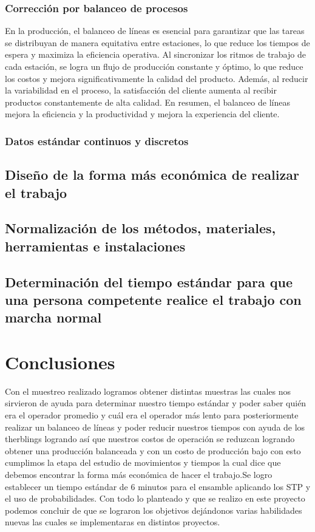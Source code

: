     \subsubsection{Corrección por balanceo de procesos}
    En la producción, el balanceo de líneas es esencial para garantizar que las tareas se distribuyan de manera equitativa entre estaciones, lo que reduce los tiempos de espera y maximiza la eficiencia operativa. Al sincronizar los ritmos de trabajo de cada estación, se logra un flujo de producción constante y óptimo, lo que reduce los costos y mejora significativamente la calidad del producto. Además, al reducir la variabilidad en el proceso, la satisfacción del cliente aumenta al recibir productos constantemente de alta calidad. En resumen, el balanceo de líneas mejora la eficiencia y la productividad y mejora la experiencia del cliente.
    \subsubsection{Datos estándar continuos y discretos}
    \subsection{Diseño de la forma más económica de realizar el trabajo}
    
    \subsection{Normalización de los métodos, materiales, herramientas e instalaciones}
    
    \subsection{Determinación del tiempo estándar para que una persona competente realice el trabajo con marcha normal}
    
    
    \section{Conclusiones}
    
    Con el muestreo realizado logramos obtener distintas muestras las cuales nos sirvieron de ayuda para determinar nuestro tiempo estándar y poder saber quién era el operador promedio y cuál era el operador más lento para posteriormente realizar un balanceo de líneas y poder reducir nuestros tiempos con ayuda de los therblings logrando así que nuestros costos de operación se reduzcan logrando obtener una producción balanceada y con un costo de producción bajo con esto cumplimos la etapa del estudio de movimientos y tiempos la cual dice que debemos encontrar la forma más económica de hacer el trabajo.Se logro establecer un tiempo estándar de  6 minutos para el ensamble aplicando los STP y el uso de probabilidades. 
    Con todo lo planteado y que se realizo en este proyecto podemos concluir de que se lograron los objetivos dejándonos varias habilidades nuevas las cuales se implementaras en distintos proyectos.
    
